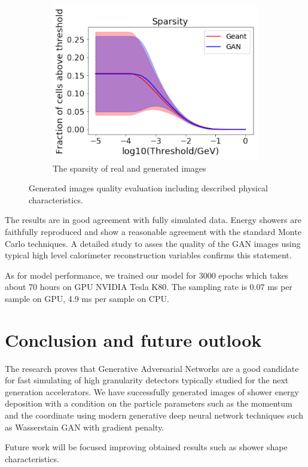 \documentclass{webofc}
\begin{document}
\begin{figure}
\begin{subfigure}{0.19\textwidth}
    \includegraphics[width=1\textwidth]{figures/sparsity.pdf}
    \caption{The sparsity of real and generated images}
  \end{subfigure}
  \caption{Generated images quality evaluation including described physical characteristics.}\label{fig:quality}  
\end{figure}

The results are in good agreement with fully simulated data. Energy showers are faithfully reproduced and show a reasonable agreement with the standard Monte Carlo techniques. A detailed study to asses the quality of the GAN images using typical high level calorimeter reconstruction variables confirms this statement.

As for model performance, we trained our model for 3000 epochs which takes about 70 hours on GPU NVIDIA Tesla K80. The sampling rate is 0.07 ms per sample on GPU, 4.9 ms per sample on CPU.

\section{Conclusion and future outlook}\label{conclusion}
The research proves that Generative Adversarial Networks are a good candidate for fast simulating of high granularity detectors typically studied for the next generation accelerators. We have successfully generated images of shower energy deposition with a condition on the particle parameters such as the momentum and the coordinate using modern generative deep neural network techniques such as Wasserstain GAN with gradient penalty.

Future work will be focused improving obtained results such as shower shape characteristics.



\appendix
\end{document}
